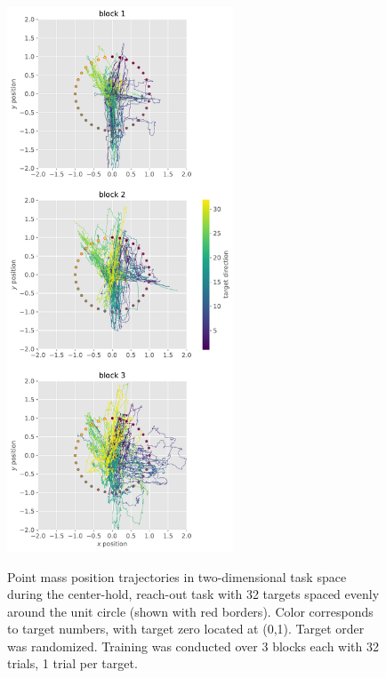 \begin{figure}
\label{fig:trajectories}
\centering
\includegraphics[width=0.6\textwidth,height=\textheight]{images/data_analysis/center_hold/trajectories.pdf}
\caption{Point mass position trajectories in two-dimensional task space
during the center-hold, reach-out task with 32 targets spaced evenly
around the unit circle (shown with red borders). Color corresponds to
target numbers, with target zero located at (0,1). Target order was
randomized. Training was conducted over 3 blocks each with 32 trials, 1
trial per target.}\label{fig:trajectories}
\end{figure}

